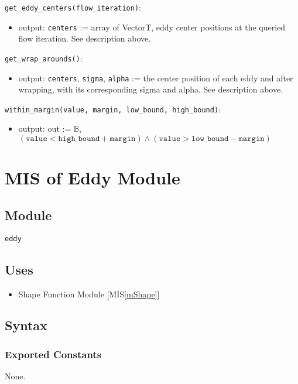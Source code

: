 \documentclass[12pt, titlepage]{article}
\begin{document}
\noindent \texttt{get\_eddy\_centers(flow\_iteration)}:
\begin{itemize}
  \item output: \texttt{centers} := array of VectorT, eddy center positions at the queried flow iteration. See description above.
\end{itemize}

\noindent \texttt{get\_wrap\_arounds()}:
\begin{itemize}
  \item output: \texttt{centers}, \texttt{sigma}, \texttt{alpha} := the center position of each eddy and after wrapping, with its corresponding sigma and alpha. See description above.
\end{itemize}

\noindent \texttt{within\_margin(value, margin, low\_bound, high\_bound)}:
\begin{itemize}
\item output: out := $\mathbb{B}$, $(\texttt{value} < \texttt{high\_bound} + \texttt{margin}) \land (\texttt{value} > \texttt{low\_bound} - \texttt{margin})$
\end{itemize}



\newpage
\section{MIS of Eddy Module} \label{mEddy} 

\subsection{Module}
\texttt{eddy}

\subsection{Uses}
\begin{itemize}
\item Shape Function Module [MIS\ref{mShape}]
\end{itemize}

\subsection{Syntax}

\subsubsection{Exported Constants}
None.
\end{document}

